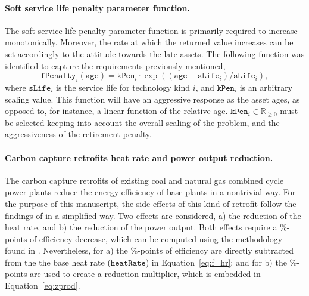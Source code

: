 \documentclass{amsart}
\begin{document}
\begin{appendices}
    \paragraph{Soft service life penalty parameter function.}
%
%
The soft service life penalty parameter function is primarily required to
increase monotonically. Moreover, the rate at which the returned value increases
can be set accordingly to the attitude towards the late assets. The following
function was identified to capture the requirements previously mentioned,
%
\begin{equation}
    \mathtt{fPenalty}_i \left(\mathtt{age}\right) = 
    \mathtt{kPen}_i \cdot \exp
    \left(
    \left(\mathtt{age}-\mathtt{sLife}_i\right)/\mathtt{sLife}_i
    \right),
\end{equation}
%
where $\mathtt{sLife}_i$ is the service life for technology kind $i$, and
$\mathtt{kPen}_i$ is an arbitrary scaling value. This function will have 
an aggressive response as the asset ages, as opposed to, for instance, a linear
function of the relative age. $\mathtt{kPen}_i \in \mathbb{R}_{\geq 0}$ must be
selected keeping into account the overall scaling of the problem, and the
aggressiveness of the retirement penalty.
%
    \paragraph{Carbon capture retrofits heat rate and power output reduction.}
The carbon capture retrofits of existing coal and natural gas combined cycle 
power plants reduce the energy efficiency of base plants in a nontrivial way.
For the purpose of this manuscript, the side effects of this kind of retrofit
follow the findings of \cite{supekar2017sourcing} in a simplified way.
Two effects are considered, a) the reduction of the heat rate, and b)
the reduction of the power output. Both effects require a \%-points of 
efficiency decrease, which can be computed using the methodology found in
\cite{supekar2017sourcing}. Nevertheless, for a) the \%-points of efficiency 
are directly subtracted from the the base heat rate ($\mathtt{heatRate}$) in 
Equation~\eqref{eq:f_hr}; and for b) the \%-points are used to create
a reduction multiplier, which is embedded in Equation~\eqref{eq:zprod}.
%
\end{appendices}
%
% 
%
\end{document}
